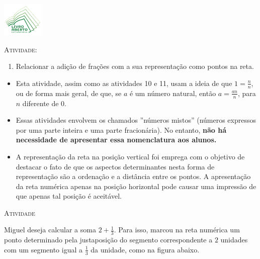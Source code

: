 \documentclass[10 pt,usenames,dvipsnames, oneside]{article}
\begin{document}
\begin{center}
  \begin{minipage}[l]{3cm}
\includegraphics[width=2cm]{../../../Figuras/logo}       
\end{minipage}\hfill
\begin{minipage}[r]{.8\textwidth}
 {\Large \scshape Atividade: }  
\end{minipage}
\end{center}
\vspace{.2cm}

\ifdefined\prof
\begin{goals}
\begin{enumerate}
\item     Relacionar a adição de frações com a sua representação como pontos na reta.
\end{enumerate}

\tcblower

\begin{itemize}
\item     Esta atividade, assim como as atividades 10 e 11,   usam a ideia de que     $1 = \frac{n}{n}$, ou de forma mais geral, de que, se     $a$     é um número natural, então     $a = \frac{an}{n}$, para     $n$     diferente de 0.
  \item Essas atividades envolvem os chamados ''números mistos'' (números expressos por uma parte inteira e uma parte fracionária). No entanto, {\bf não há necessidade de apresentar essa nomenclatura aos alunos.}
\item A representação da reta na posição vertical foi emprega com o objetivo de destacar o fato de que os aspectos determinantes nesta forma de representação são a ordenação e a distância entre os pontos. A apresentação da reta numérica apenas na posição horizontal pode causar uma impressão de que apenas tal posição é aceitável.
\end{itemize}
\end{goals}

\bigskip
\begin{center}
{\large \scshape Atividade}
\end{center}
\fi

Miguel deseja calcular a soma $2 + \frac{1}{3}$. Para isso, marcou na reta numérica um ponto determinado pela justaposição do segmento correspondente a $2$ unidades com um segmento igual a $\frac{1}{3}$ da unidade, como na figura abaixo.
\end{document}
